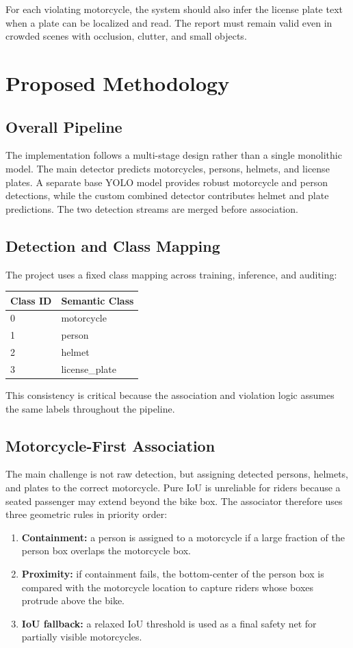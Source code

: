 \documentclass[conference]{IEEEtran}
\begin{document}
For each violating motorcycle, the system should also infer the license plate text when a plate can be localized and read. The report must remain valid even in crowded scenes with occlusion, clutter, and small objects.

\section{Proposed Methodology}
\subsection{Overall Pipeline}
The implementation follows a multi-stage design rather than a single monolithic model. The main detector predicts motorcycles, persons, helmets, and license plates. A separate base YOLO model provides robust motorcycle and person detections, while the custom combined detector contributes helmet and plate predictions. The two detection streams are merged before association.

\subsection{Detection and Class Mapping}
The project uses a fixed class mapping across training, inference, and auditing:
\begin{center}
\begin{tabular}{ll}
\toprule
Class ID & Semantic Class \\
\midrule
0 & motorcycle \\
1 & person \\
2 & helmet \\
3 & license\_plate \\
\bottomrule
\end{tabular}
\end{center}

This consistency is critical because the association and violation logic assumes the same labels throughout the pipeline.

\subsection{Motorcycle-First Association}
The main challenge is not raw detection, but assigning detected persons, helmets, and plates to the correct motorcycle. Pure IoU is unreliable for riders because a seated passenger may extend beyond the bike box. The associator therefore uses three geometric rules in priority order:
\begin{enumerate}
        \item \textbf{Containment:} a person is assigned to a motorcycle if a large fraction of the person box overlaps the motorcycle box.
        \item \textbf{Proximity:} if containment fails, the bottom-center of the person box is compared with the motorcycle location to capture riders whose boxes protrude above the bike.
        \item \textbf{IoU fallback:} a relaxed IoU threshold is used as a final safety net for partially visible motorcycles.
\end{enumerate}
\end{document}
